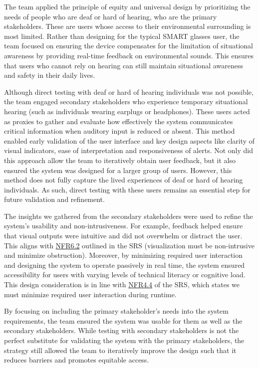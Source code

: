 \documentclass{article}
\begin{document}
The team applied the principle of equity and universal design by prioritizing
the needs of people who are deaf or hard of hearing, who are the primary
stakeholders. These are users whose access to their environmental surrounding is
most limited. Rather than designing for the typical SMART glasses user, the team
focused on  ensuring the device compensates for the limitation of situational
awareness by  providing real-time feedback on environmental sounds. This ensures
that users who cannot rely on hearing can still maintain situational awareness
and safety in their daily lives.

Although direct testing with deaf or hard of hearing individuals was not
possible, the team engaged secondary stakeholders who experience temporary
situational hearing (such as individuals wearing earplugs or
headphones). These users acted as proxies to gather and evaluate how
effectively the system communicates critical information when auditory input is
reduced or absent. This method enabled early validation of the user interface
and key design aspects like clarity of visual indicators, ease of
interpretation and responsiveness of alerts. Not only did this approach allow 
the team to iteratively obtain user feedback, but it also ensured the system 
was designed for a larger group of users. However, this method does not fully
capture the lived experiences of deaf or hard of hearing individuals.
As such, direct testing with these users remains an essential step for future
validation and refinement.

The insights we gathered from the secondary stakeholders were used to refine
the system's usability and non-intrusiveness. For example, feedback helped
ensure that visual outputs were intuitive and did not overwhelm or distract
the user. This aligns with \hyperref[SRS-NFR6_2]{NFR6.2} outlined in the SRS
(visualization must be non-intrusive and minimize obstruction).
Moreover, by minimizing required user interaction and designing the system to
operate passively in real time, the system ensured
accessibility for users with varying levels of technical literacy or cognitive
load. This design consideration is in line with \hyperref[SRS-NFR4_4]{NFR4.4} 
of the SRS, which states we must minimize required user interaction during
runtime.

By focusing on including the primary stakeholder's needs into the system
requirements, the team ensured the system was usable for them as well as 
the secondary stakeholders. While testing with secondary stakeholders is not
the perfect substitute for validating the system with the primary stakeholders,
the strategy still allowed the team to iteratively improve the design such that
it reduces barriers and promotes equitable access.
\end{document}
